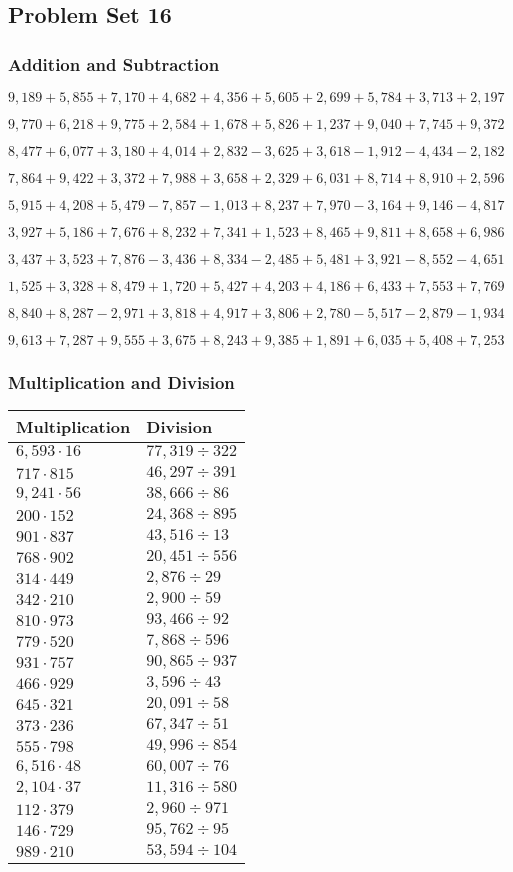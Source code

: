 \hypertarget{problem-set-16-3}{%
\subsection{Problem Set 16}\label{problem-set-16-3}}

\hypertarget{addition-and-subtraction-178}{%
\subsubsection{Addition and
Subtraction}\label{addition-and-subtraction-178}}

\(9,189+5,855+7,170+4,682+4,356+5,605+2,699+5,784+3,713+ 2,197\)

\(9,770+6,218+9,775+2,584+1,678+5,826+1,237+9,040+7,745+9,372\)

\(8,477+6,077+3,180+4,014+2,832-3,625+3,618-1,912-4,434-2,182\)

\(7,864+9,422+3,372+7,988+3,658+2,329+6,031+8,714+8,910+2,596\)

\(5,915+4,208+5,479-7,857-1,013+8,237+7,970-3,164+9,146-4,817\)

\(3,927+5,186+7,676+8,232+7,341+1,523+8,465+9,811+8,658+6,986\)

\(3,437+3,523+7,876-3,436+8,334-2,485+5,481+3,921-8,552-4,651\)

\(1,525+3,328+8,479+1,720+5,427+4,203+4,186+6,433+7,553+7,769\)

\(8,840+8,287-2,971+3,818+4,917+3,806+2,780-5,517-2,879-1,934\)

\(9,613+7,287+9,555+3,675+8,243+9,385+1,891+6,035+5,408+7,253\)

\hypertarget{multiplication-and-division-177}{%
\subsubsection{Multiplication and
Division}\label{multiplication-and-division-177}}

\begin{longtable}[]{@{}ll@{}}
\toprule
Multiplication & Division\tabularnewline
\midrule
\endhead
\(6,593\cdot16\) & \(77,319÷322\)\tabularnewline
\(717\cdot815\) & \(46,297÷391\)\tabularnewline
\(9,241\cdot56\) & \(38,666÷86\)\tabularnewline
\(200\cdot152\) & \(24,368÷895\)\tabularnewline
\(901\cdot837\) & \(43,516÷13\)\tabularnewline
\(768\cdot902\) & \(20,451÷556\)\tabularnewline
\(314\cdot449\) & \(2,876÷29\)\tabularnewline
\(342\cdot210\) & \(2,900÷59\)\tabularnewline
\(810\cdot973\) & \(93,466÷92\)\tabularnewline
\(779\cdot520\) & \(7,868÷596\)\tabularnewline
\(931\cdot757\) & \(90,865÷937\)\tabularnewline
\(466\cdot929\) & \(3,596÷43\)\tabularnewline
\(645\cdot321\) & \(20,091÷58\)\tabularnewline
\(373\cdot236\) & \(67,347÷51\)\tabularnewline
\(555\cdot798\) & \(49,996÷854\)\tabularnewline
\(6,516\cdot48\) & \(60,007÷76\)\tabularnewline
\(2,104\cdot37\) & \(11,316÷580\)\tabularnewline
\(112\cdot379\) & \(2,960÷971\)\tabularnewline
\(146\cdot729\) & \(95,762÷95\)\tabularnewline
\(989\cdot210\) & \(53,594÷104\)\tabularnewline
\bottomrule
\end{longtable}

